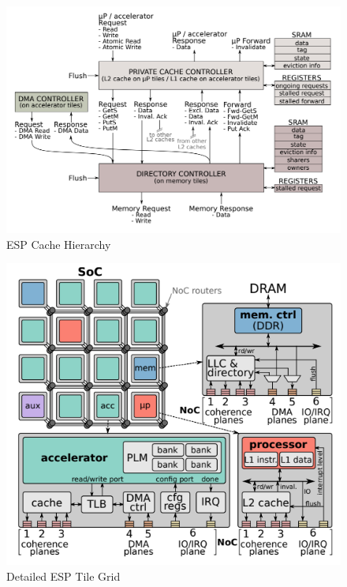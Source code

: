 \begin{figure}[h]
  \centering
  \captionsetup{justification=centering, format=hang}
  \includegraphics[width=1\columnwidth]{fig/esp_hier.png}
  \caption{ESP Cache Hierarchy~\cite{giri18}}
  \label{fig:esp_hier}
  \end{figure}

\begin{figure}[h]
  \centering
  \captionsetup{justification=centering, format=hang}
  \includegraphics[width=1\columnwidth]{fig/noccache.png}
  \caption{Detailed ESP Tile Grid~\cite{giri18}}
  \label{fig:esp_tile}
  \end{figure}

